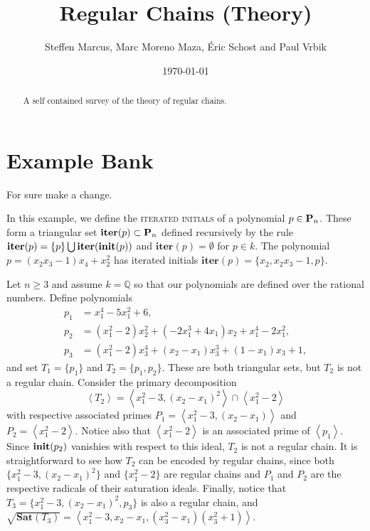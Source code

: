 \documentclass[12pt]{article}
\title{Regular Chains (Theory)}
\author{Steffen Marcus, Marc Moreno Maza, \'Eric Schost and Paul Vrbik}
\date{\today}
\newcommand{\Emph}[1]{\textsc{#1}}
\begin{document}
\maketitle


\begin{abstract}
A self contained survey of the theory of regular chains.
\end{abstract}

\section*{Example Bank}

For sure make a change.

\begin{example}  
In this example, we define the \Emph{iterated initials} of a polynomial $p\in\mathbf{P}_n$.  These form a triangular set $\textbf{iter}(p)\subset \mathbf{P}_n$ defined recursively by the rule $\textbf{iter}(p)=\{p\}\bigcup\textbf{iter}(\textbf{init}(p))$ and $\textbf{iter}(p) = \emptyset$ for $p\in k$.  The polynomial $p=(x_2x_3-1)x_4+x_2^2$ has iterated initials $\textbf{iter}(p)=\{x_2,x_2x_3-1,p\}$.
\end{example}

\begin{example}   
Let $n\geq 3$ and assume $k=\mathbb{Q}$ so that our polynomials are defined over the rational numbers.  Define polynomials
\begin{align*}
p_1 &= x_1^4-5x_1^2+6,\\
p_2 &=(x_1^2-2)x_2^2+(-2x_1^3+4x_1)x_2+x_1^4-2x_1^2,\\
p_3 &=(x_1^2-2)x_3^4+(x_2-x_1)x_3^3+(1-x_1)x_3+1,
\end{align*}
and set $T_1=\{p_1\}$ and $T_2=\{p_1,p_2\}$.  These are both triangular sets, but $T_2$ is not a regular chain.  Consider the primary decomposition
\[
\left<T_2\right>=\left<x_1^2-3,(x_2-x_1)^2\right>\cap\left<x_1^2-2\right>
\]
with respective associated primes $P_1=\left<x_1^2-3,(x_2-x_1)\right>$ and $P_2=\left<x_1^2-2\right>.$  Notice also that $\left<x_1^2-2\right>$ is an associated prime of $\left<p_1\right>$.  Since $\textbf{init}(p_2)$ vanishies with respect to this ideal, $T_2$ is not a regular chain.  It is straightforward to see how $T_2$ can be encoded by regular chains, since both $\{x_1^2-3,(x_2-x_1)^2\}$ and $\{x_1^2-2\}$ are regular chains and $P_1$ and $P_2$ are the respective radicals of their saturation ideals.  Finally, notice that $T_3=\{x_1^2-3,(x_2-x_1)^2, p_3\}$ is also a regular chain, and $\sqrt{\textbf{Sat}(T_3)}=\left<x_1^2-3,x_2-x_1, (x_3^2-x_1)(x_3^2+1)\right>$.
\end{example}
\end{document}
